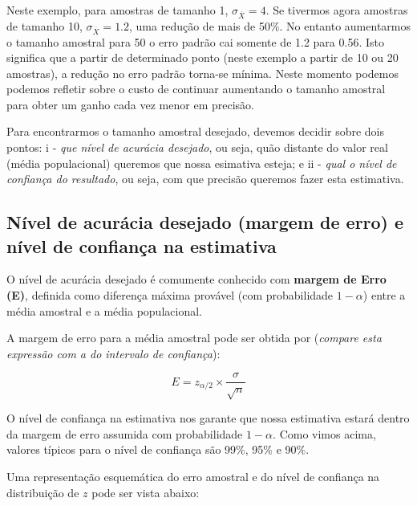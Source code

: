 \documentclass[
]{book}
\begin{document}
Neste exemplo, para amostras de tamanho 1, \(\sigma_{\overline{X}} = 4\). Se tivermos agora amostras de tamanho 10, \(\sigma_{\overline{X}} = 1.2\), uma redução de mais de 50\%. No entanto aumentarmos o tamanho amostral para 50 o erro padrão cai somente de 1.2 para 0.56. Isto significa que a partir de determinado ponto (neste exemplo a partir de 10 ou 20 amostras), a redução no erro padrão torna-se mínima. Neste momento podemos podemos refletir sobre o custo de continuar aumentando o tamanho amostral para obter um ganho cada vez menor em precisão.

Para encontrarmos o tamanho amostral desejado, devemos decidir sobre dois pontos: i - \emph{que nível de acurácia desejado}, ou seja, quão distante do valor real (média populacional) queremos que nossa esimativa esteja; e ii - \emph{qual o nível de confiança do resultado}, ou seja, com que precisão queremos fazer esta estimativa.

\hypertarget{nuxedvel-de-acuruxe1cia-desejado-margem-de-erro-e-nuxedvel-de-confianuxe7a-na-estimativa}{%
\subsection{Nível de acurácia desejado (margem de erro) e nível de confiança na estimativa}\label{nuxedvel-de-acuruxe1cia-desejado-margem-de-erro-e-nuxedvel-de-confianuxe7a-na-estimativa}}

O nível de acurácia desejado é comumente conhecido com \textbf{margem de Erro (E)}, definida como diferença máxima provável (com probabilidade \(1-\alpha\)) entre a média amostral e a média populacional.

A margem de erro para a média amostral pode ser obtida por (\emph{compare esta expressão com a do intervalo de confiança}):

\[E = z_{\alpha/2} \times \frac{\sigma}{\sqrt{n}}\]

O nível de confiança na estimativa nos garante que nossa estimativa estará dentro da margem de erro assumida com probabilidade \(1-\alpha\). Como vimos acima, valores típicos para o nível de confiança são 99\%, 95\% e 90\%.

Uma representação esquemática do erro amostral e do nível de confiança na distribuição de \(z\) pode ser vista abaixo:
\end{document}
